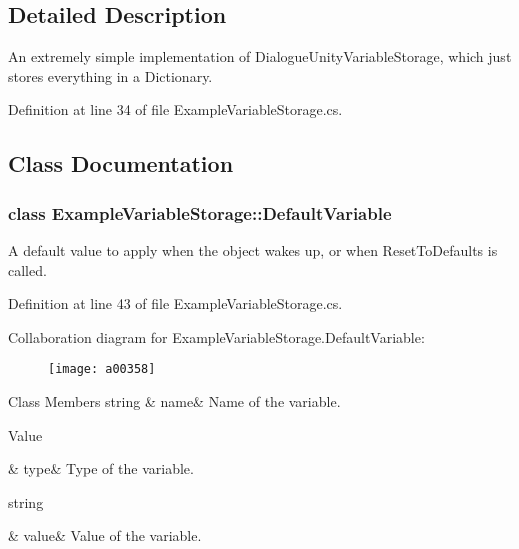 \subsection{Detailed Description}
An extremely simple implementation of Dialogue\-Unity\-Variable\-Storage, which just stores everything in a Dictionary. 

Definition at line 34 of file Example\-Variable\-Storage.\-cs.



\subsection{Class Documentation}
\label{a00348}
\hypertarget{a00085_a00348}{}
\subsubsection{class Example\-Variable\-Storage\-:\-:Default\-Variable}
A default value to apply when the object wakes up, or when Reset\-To\-Defaults is called. 

Definition at line 43 of file Example\-Variable\-Storage.\-cs.



Collaboration diagram for Example\-Variable\-Storage.\-Default\-Variable\-:
\nopagebreak
\begin{figure}[H]
\begin{center}
\leavevmode
\texttt{[image: a00358]}
\end{center}
\end{figure}
\begin{DoxyFields}{Class Members}
\hypertarget{a00085_a609feaa53936e7dc42248ff2ba68454a}{string}\label{a00085_a609feaa53936e7dc42248ff2ba68454a}
&
name&
Name of the variable. \\
\hline

\hypertarget{a00085_a904347efdca12f40243c7dedb646153d}{Value}\label{a00085_a904347efdca12f40243c7dedb646153d}
&
type&
Type of the variable. \\
\hline

\hypertarget{a00085_a0f00ecb21b58aa754a4bbb61edf62818}{string}\label{a00085_a0f00ecb21b58aa754a4bbb61edf62818}
&
value&
Value of the variable. \\
\hline

\end{DoxyFields}


